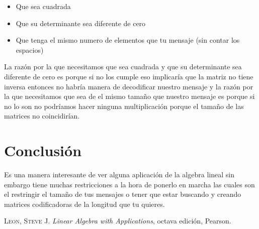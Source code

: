 \documentclass[12pt,letterpaper]{report}
\begin{document}
\begin{itemize}
\item Que sea cuadrada
\item Que su determinante sea diferente de cero
\item Que tenga el mismo numero de elementos que tu mensaje (sin contar los espacios) 
\end{itemize}

La razón por la que necesitamos que sea cuadrada y que su determinante sea diferente de cero es porque si no los cumple eso implicaría que la matriz no tiene inversa entonces no habría manera de decodificar nuestro mensaje y la razón por la que necesitamos que sea de el mismo tamaño que nuestro mensaje es porque si no lo son no podríamos hacer ninguna multiplicación porque el tamaño de las matrices no coincidirían.

\newpage
\section*{Conclusión}
Es una manera interesante de ver alguna aplicación de la algebra lineal sin embargo tiene muchas restricciones a la hora de ponerlo en marcha las cuales son el restringir el tamaño de tus mensajes o tener que estar buscando y creando matrices codificadoras de la longitud que tu quieres.

\begin{thebibliography}{X}
 \textsc{Leon, Steve J.}
\textit{Linear Algebra with Applications}, octava edición,
Pearson.
\end{thebibliography}
\end{document}
